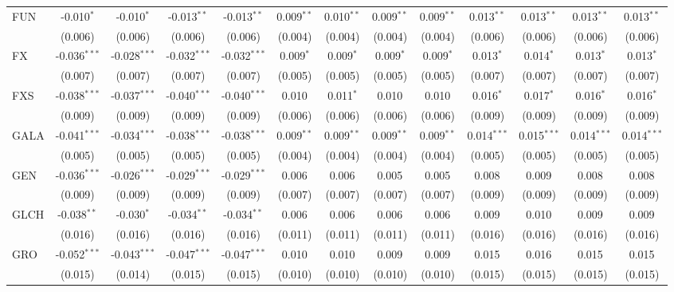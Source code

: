 \begin{table}[!htbp]
\begin{tabular}{@{\extracolsep{5pt}}lcccccccccccc}
 FUN & -0.010$^{*}$ & -0.010$^{*}$ & -0.013$^{**}$ & -0.013$^{**}$ & 0.009$^{**}$ & 0.010$^{**}$ & 0.009$^{**}$ & 0.009$^{**}$ & 0.013$^{**}$ & 0.013$^{**}$ & 0.013$^{**}$ & 0.013$^{**}$ \\
  & (0.006) & (0.006) & (0.006) & (0.006) & (0.004) & (0.004) & (0.004) & (0.004) & (0.006) & (0.006) & (0.006) & (0.006) \\
 FX & -0.036$^{***}$ & -0.028$^{***}$ & -0.032$^{***}$ & -0.032$^{***}$ & 0.009$^{*}$ & 0.009$^{*}$ & 0.009$^{*}$ & 0.009$^{*}$ & 0.013$^{*}$ & 0.014$^{*}$ & 0.013$^{*}$ & 0.013$^{*}$ \\
  & (0.007) & (0.007) & (0.007) & (0.007) & (0.005) & (0.005) & (0.005) & (0.005) & (0.007) & (0.007) & (0.007) & (0.007) \\
 FXS & -0.038$^{***}$ & -0.037$^{***}$ & -0.040$^{***}$ & -0.040$^{***}$ & 0.010$^{}$ & 0.011$^{*}$ & 0.010$^{}$ & 0.010$^{}$ & 0.016$^{*}$ & 0.017$^{*}$ & 0.016$^{*}$ & 0.016$^{*}$ \\
  & (0.009) & (0.009) & (0.009) & (0.009) & (0.006) & (0.006) & (0.006) & (0.006) & (0.009) & (0.009) & (0.009) & (0.009) \\
 GALA & -0.041$^{***}$ & -0.034$^{***}$ & -0.038$^{***}$ & -0.038$^{***}$ & 0.009$^{**}$ & 0.009$^{**}$ & 0.009$^{**}$ & 0.009$^{**}$ & 0.014$^{***}$ & 0.015$^{***}$ & 0.014$^{***}$ & 0.014$^{***}$ \\
  & (0.005) & (0.005) & (0.005) & (0.005) & (0.004) & (0.004) & (0.004) & (0.004) & (0.005) & (0.005) & (0.005) & (0.005) \\
 GEN & -0.036$^{***}$ & -0.026$^{***}$ & -0.029$^{***}$ & -0.029$^{***}$ & 0.006$^{}$ & 0.006$^{}$ & 0.005$^{}$ & 0.005$^{}$ & 0.008$^{}$ & 0.009$^{}$ & 0.008$^{}$ & 0.008$^{}$ \\
  & (0.009) & (0.009) & (0.009) & (0.009) & (0.007) & (0.007) & (0.007) & (0.007) & (0.009) & (0.009) & (0.009) & (0.009) \\
 GLCH & -0.038$^{**}$ & -0.030$^{*}$ & -0.034$^{**}$ & -0.034$^{**}$ & 0.006$^{}$ & 0.006$^{}$ & 0.006$^{}$ & 0.006$^{}$ & 0.009$^{}$ & 0.010$^{}$ & 0.009$^{}$ & 0.009$^{}$ \\
  & (0.016) & (0.016) & (0.016) & (0.016) & (0.011) & (0.011) & (0.011) & (0.011) & (0.016) & (0.016) & (0.016) & (0.016) \\
 GRO & -0.052$^{***}$ & -0.043$^{***}$ & -0.047$^{***}$ & -0.047$^{***}$ & 0.010$^{}$ & 0.010$^{}$ & 0.009$^{}$ & 0.009$^{}$ & 0.015$^{}$ & 0.016$^{}$ & 0.015$^{}$ & 0.015$^{}$ \\
  & (0.015) & (0.014) & (0.015) & (0.015) & (0.010) & (0.010) & (0.010) & (0.010) & (0.015) & (0.015) & (0.015) & (0.015) \\

\end{tabular}
\end{table}
